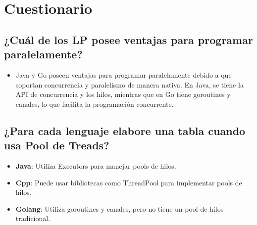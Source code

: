 \section{Cuestionario}

\subsection{¿Cuál de los LP posee ventajas para programar paralelamente?}

\begin{itemize}
    \item Java y Go poseen ventajas para programar paralelamente debido a que soportan concurrencia y paralelismo de manera nativa. En Java, se tiene la API de concurrencia y los hilos, mientras que en Go tiene goroutines y canales, lo que facilita la programación concurrente.
\end{itemize}


\subsection{¿Para cada lenguaje elabore una tabla cuando usa Pool de Treads?}

\begin{itemize}
    \item \textbf{Java}: Utiliza Executors para manejar pools de hilos.
    \item \textbf{Cpp}: Puede usar bibliotecas como ThreadPool para implementar pools de hilos.
    \item \textbf{Golang}: Utiliza goroutines y canales, pero no tiene un pool de hilos tradicional.
\end{itemize}




